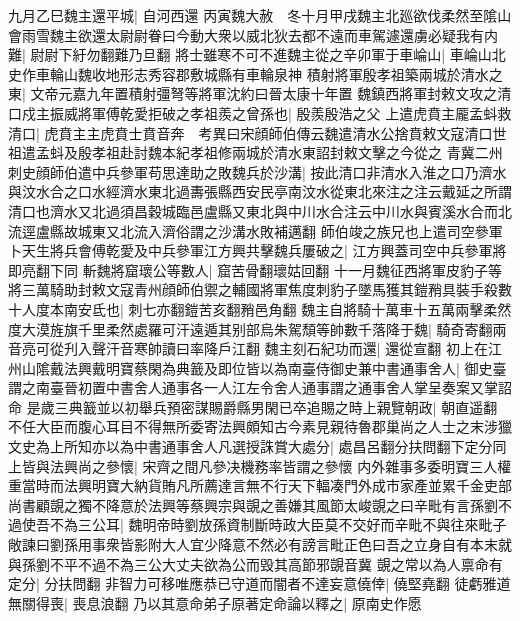 九月乙巳魏主還平城|{
	自河西還}
丙寅魏大赦　冬十月甲戌魏主北廵欲伐柔然至隂山會雨雪魏主欲還太尉尉眷曰今動大衆以威北狄去都不遠而車駕遽還虜必疑我有内難|{
	尉尉下紆勿翻難乃旦翻}
將士雖寒不可不進魏主從之辛卯軍于車崘山|{
	車崘山北史作車輪山魏收地形志秀容郡敷城縣有車輪泉神}
積射將軍殷孝祖築兩城於清水之東|{
	文帝元嘉九年置積射彊弩等將軍沈約曰晉太康十年置}
魏鎮西將軍封敕文攻之清口戍主振威將軍傅乾愛拒破之孝祖羨之曾孫也|{
	殷羨殷浩之父}
上遣虎賁主龎孟蚪救清口|{
	虎賁主主虎賁士賁音奔　考異曰宋顔師伯傳云魏遣清水公捨賁敕文寇清口世祖遣孟蚪及殷孝祖赴討魏本紀孝祖修兩城於清水東詔封敕文擊之今從之}
青冀二州刺史顔師伯遣中兵參軍苟思達助之敗魏兵於沙溝|{
	按此清口非清水入淮之口乃濟水與汶水合之口水經濟水東北過夀張縣西安民亭南汶水從東北來注之注云戴延之所謂清口也濟水又北過須昌穀城臨邑盧縣又東北與中川水合注云中川水與賓溪水合而北流逕盧縣故城東又北流入濟俗謂之沙溝水敗補邁翻}
師伯竣之族兄也上遣司空參軍卜天生將兵會傅乾愛及中兵參軍江方興共擊魏兵屢破之|{
	江方興蓋司空中兵參軍將即亮翻下同}
斬魏將窟瓌公等數人|{
	窟苦骨翻瓌姑回翻}
十一月魏征西將軍皮豹子等將三萬騎助封敕文寇青州顔師伯禦之輔國將軍焦度刺豹子墜馬獲其鎧矟具裝手殺數十人度本南安氐也|{
	刺七亦翻鎧苦亥翻矟邑角翻}
魏主自將騎十萬車十五萬兩擊柔然度大漠旌旗千里柔然處羅可汗遠遁其别部烏朱駕頹等帥數千落降于魏|{
	騎奇寄翻兩音亮可從刋入聲汗音寒帥讀曰率降戶江翻}
魏主刻石紀功而還|{
	還從宣翻}
初上在江州山隂戴法興戴明寶蔡閑為典籖及即位皆以為南臺侍御史兼中書通事舍人|{
	御史臺謂之南臺晉初置中書舍人通事各一人江左令舍人通事謂之通事舍人掌呈奏案又掌詔命}
是歲三典籖並以初舉兵預密謀賜爵縣男閑已卒追賜之時上親覽朝政|{
	朝直遥翻}
不任大臣而腹心耳目不得無所委寄法興頗知古今素見親待魯郡巢尚之人士之末涉獵文史為上所知亦以為中書通事舍人凡選授誅賞大處分|{
	處昌呂翻分扶問翻下定分同}
上皆與法興尚之參懷|{
	宋齊之間凡參决機務率皆謂之參懷}
内外雜事多委明寶三人權重當時而法興明寶大納貨賄凡所薦達言無不行天下輻凑門外成市家產並累千金吏部尚書顧覬之獨不降意於法興等蔡興宗與覬之善嫌其風節太峻覬之曰辛毗有言孫劉不過使吾不為三公耳|{
	魏明帝時劉放孫資制斷時政大臣莫不交好而辛毗不與往來毗子敞諫曰劉孫用事衆皆影附大人宜少降意不然必有謗言毗正色曰吾之立身自有本末就與孫劉不平不過不為三公大丈夫欲為公而毁其高節邪覬音冀}
覬之常以為人禀命有定分|{
	分扶問翻}
非智力可移唯應恭已守道而闇者不達妄意僥倖|{
	僥堅堯翻}
徒虧雅道無關得喪|{
	喪息浪翻}
乃以其意命弟子原著定命論以釋之|{
	原南史作愿}


